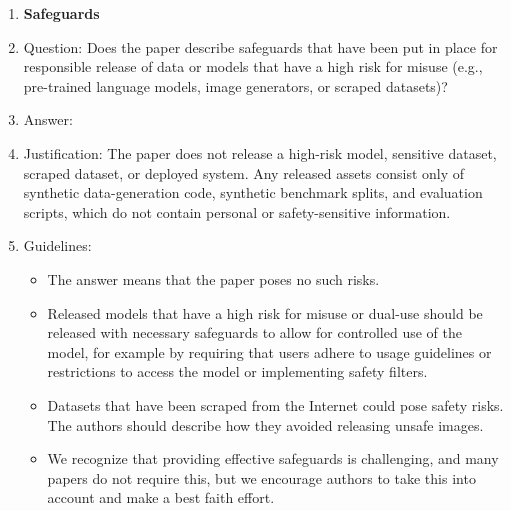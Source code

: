 \documentclass{article}
\theoremstyle{plain}
\theoremstyle{definition}
\theoremstyle{remark}
\begin{document}
\begin{enumerate}
\item {\bf Safeguards}
    \item[] Question: Does the paper describe safeguards that have been put in place for responsible release of data or models that have a high risk for misuse (e.g., pre-trained language models, image generators, or scraped datasets)?
    \item[] Answer: \answerNA{}
    \item[] Justification: The paper does not release a high-risk model, sensitive dataset, scraped dataset, or deployed system. Any released assets consist only of synthetic data-generation code, synthetic benchmark splits, and evaluation scripts, which do not contain personal or safety-sensitive information.
    \item[] Guidelines:
    \begin{itemize}
        \item The answer \answerNA{} means that the paper poses no such risks.
        \item Released models that have a high risk for misuse or dual-use should be released with necessary safeguards to allow for controlled use of the model, for example by requiring that users adhere to usage guidelines or restrictions to access the model or implementing safety filters. 
        \item Datasets that have been scraped from the Internet could pose safety risks. The authors should describe how they avoided releasing unsafe images.
        \item We recognize that providing effective safeguards is challenging, and many papers do not require this, but we encourage authors to take this into account and make a best faith effort.
    \end{itemize}


\end{enumerate}
\end{document}
